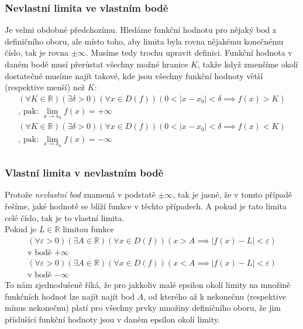 \documentclass[12pt]{article}
\providecommand{\abs}[1]{\lvert#1\rvert}
\newcommand{\nR}{\mathbb{R}} %
\begin{document}
\subsubsection{Nevlastní limita ve vlastním bodě}
Je velmi obdobné předchozímu. Hledáme funkční hodnotu pro nějaký bod z definičního oboru, ale místo toho, aby limita byla rovna nějakému konečnému číslo, tak je rovna $\pm \infty$. Musíme tedy trochu upravit definici. Funkční hodnota v daném bodě musí přerůstat všechny možné hranice $K$, takže když zmenšíme okolí dostatečně musíme najít takové, kde jsou všechny funkční hodnoty větší (respektive menší) než $K$:
\begin{align}
( \forall K \in \nR) ( \exists \delta >0) ( \forall x \in D(f)) (0 < \abs{x-x_0} < \delta \implies f(x) > K)\\
\text{, pak:	} \lim_{x \to x_0} f(x) = + \infty\\
( \forall K \in \nR) ( \exists \delta >0) ( \forall x \in D(f)) (0 < \abs{x-x_0} < \delta \implies f(x) < K)\\
\text{, pak:	} \lim_{x \to x_0} f(x) = - \infty\\
\end{align}
\subsubsection{Vlastní limita v nevlastním bodě}
Protože \emph{nevlastní bod} znamená v podstatě $\pm \infty$, tak je jasné, že v tomto případě řešíme, jaké hodnotě se blíží funkce v těchto případech. A pokud je tato limita celé číslo, tak je to vlastní limita.\\
Pokud je $L \in \nR$ limitou funkce
\begin{align}
( \forall \varepsilon >0)( \exists A \in \nR) (\forall x \in D(f)) (x>A \implies \abs{f(x)-L} < \varepsilon)\\
\text{v bodě $+ \infty$}\\
( \forall \varepsilon >0)( \exists A \in \nR) (\forall x \in D(f)) (x<A \implies \abs{f(x)-L} < \varepsilon)\\
\text{v bodě $- \infty$}
\end{align}
To nám zjednodušeně říká, že pro jakkoliv malé epsilon okolí limity na množině funkčních hodnot lze najít najít bod $A$, od kterého až k nekonečnu (respektive mínus nekonečnu) platí pro všechny prvky množiny definičního oboru, že jim příslušící funkční hodnoty jsou v daném epsilon okolí limity.
\end{document}
